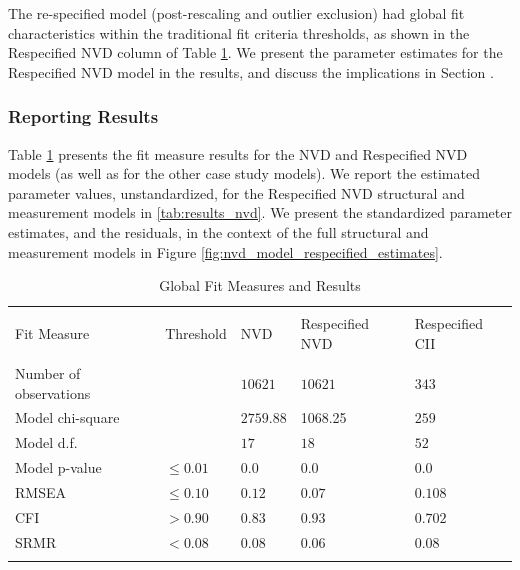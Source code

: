 The re-specified model (post-rescaling and outlier exclusion) had global fit characteristics within the traditional fit criteria thresholds, as shown in the Respecified NVD column of Table \ref{tab:results_fit_all}. We present the parameter estimates for the Respecified NVD model in the results, and discuss the implications in Section \label{sec:case_nvd_discussion}.

\subsubsection{Reporting Results}
\label{sec:case_nvd_results}

Table \ref{tab:results_fit_all} presents the fit measure results for the NVD  and Respecified NVD models (as well as for the other case study models). We report the estimated parameter values, unstandardized, for the Respecified NVD structural and measurement models in \ref{tab:results_nvd}. We present the standardized parameter estimates, and the residuals, in the context of the full structural and measurement models in Figure \ref{fig:nvd_model_respecified_estimates}.

\begin{table}
	\begin{center}	
		\caption{Global Fit Measures and Results}
			\label{tab:results_fit_all}
			\begin{tabular}{p{3cm}p{1cm}|p{2cm}p{2cm}p{2cm}}
				\\[-1.8ex]\hline 
				\hline \\[-1.8ex] 
				Fit Measure & Threshold & NVD	& Respecified NVD & Respecified CII  \\
				\hline \\[-1.8ex] 				
				Number of observations &  & $10621$  & $10621$ & $343$  \\				
				Model chi-square &  & $2759.88$ & 1068.25 & $259$  \\				
				Model d.f. &  & $17$ & $18$ & $52$  \\		
				Model p-value & $\leq 0.01$ & $0.0$ & $0.0$ & $0.0$  \\
				RMSEA & $\leq 0.10$ &  $0.12$ &  $0.07$ & $0.108$   \\
				CFI & $> 0.90$ & $0.83$ & $0.93$  & $0.702$  \\
				SRMR & $< 0.08$ & $0.08$ & $0.06$ & $0.08$  \\
				\hline \\[-1.8ex] 				
			\end{tabular}
	\end{center}
\end{table}

